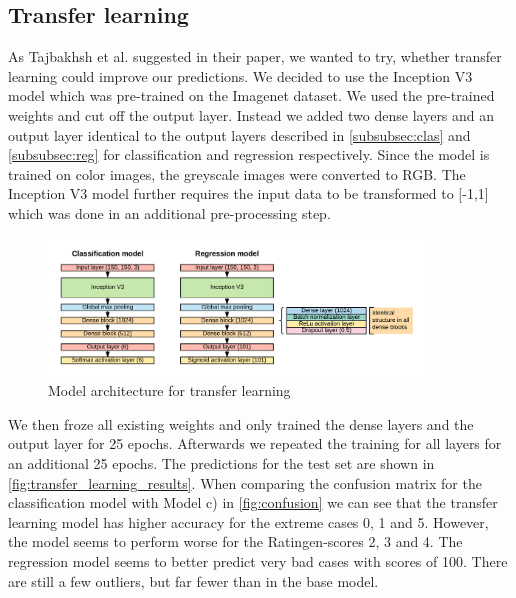 \documentclass[12pt]{article}
\begin{document}
\subsection{Transfer learning}
\label{subsec:tl}

As Tajbakhsh et al. \cite{tajbakhsh_2017} suggested in their paper, we wanted to try, whether transfer learning could improve our predictions. We decided to use the Inception V3 model \cite{szegedy_2015} which was pre-trained on the Imagenet dataset. We used the pre-trained weights and cut off the output layer. Instead we added two dense layers and an output layer identical to the output layers described in \ref{subsubsec:clas} and \ref{subsubsec:reg} for classification and regression respectively. Since the model is trained on color images, the greyscale images were converted to RGB. The Inception V3 model further requires the input data to be transformed to [-1,1] which was done in an additional pre-processing step.

\begin{figure}[ht]
\includegraphics[width=10cm]{transfer_learning}	
\caption{Model architecture for transfer learning}
\label{fig:transfer_learning}
\end{figure}

We then froze all existing weights and only trained the dense layers and the output layer for 25 epochs. Afterwards we repeated the training for all layers for an additional 25 epochs. The predictions for the test set are shown in \autoref{fig:transfer_learning_results}. When comparing the confusion matrix for the classification model with Model c) in \autoref{fig:confusion} we can see that the transfer learning model has higher accuracy for the extreme cases 0, 1 and 5. However, the model seems to perform worse for the Ratingen-scores 2, 3 and 4. The regression model seems to better predict very bad cases with scores of 100. There are still a few outliers, but far fewer than in the base model.
\end{document}
